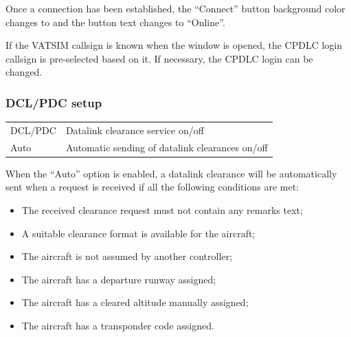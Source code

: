 \documentclass[a4paper,oneside,11pt]{memoir}
\begin{document}
Once a connection has been established, the “Connect” button background color changes to  and the button text changes to “Online”.


If the VATSIM callsign is known when the window is opened, the CPDLC login callsign is pre-selected based on it. If necessary, the CPDLC login can be changed.

\subsubsection*{DCL/PDC setup}

\begin{longtable}{p{2.5cm} p{10cm}}
  DCL/PDC & Datalink clearance service on/off\\
  Auto    & Automatic sending of datalink clearances on/off\\
\end{longtable}


When the “Auto” option is enabled, a datalink clearance will be automatically sent when a request is received if all the following conditions are met:

\begin{itemize}
  \item The received clearance request must not contain any remarks text;\\
  \item A suitable clearance format is available for the aircraft;\\
  \item The aircraft is not assumed by another controller;\\
  \item The aircraft has a departure runway assigned;\\
  \item The aircraft has a cleared altitude manually assigned;\\
  \item The aircraft has a transponder code assigned.\\
\end{itemize}
\end{document}
